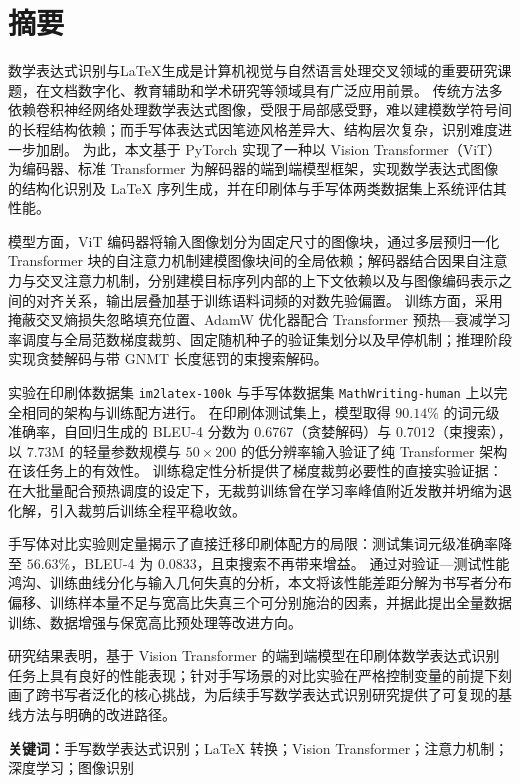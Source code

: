 \section*{\heiti{}摘\qquad 要}

数学表达式识别与LaTeX生成是计算机视觉与自然语言处理交叉领域的重要研究课题，在文档数字化、教育辅助和学术研究等领域具有广泛应用前景。
传统方法多依赖卷积神经网络处理数学表达式图像，受限于局部感受野，难以建模数学符号间的长程结构依赖；而手写体表达式因笔迹风格差异大、结构层次复杂，识别难度进一步加剧。
为此，本文基于 PyTorch 实现了一种以 Vision Transformer（ViT）为编码器、标准 Transformer 为解码器的端到端模型框架，实现数学表达式图像的结构化识别及 LaTeX 序列生成，并在印刷体与手写体两类数据集上系统评估其性能。

模型方面，ViT 编码器将输入图像划分为固定尺寸的图像块，通过多层预归一化 Transformer 块的自注意力机制建模图像块间的全局依赖；解码器结合因果自注意力与交叉注意力机制，分别建模目标序列内部的上下文依赖以及与图像编码表示之间的对齐关系，输出层叠加基于训练语料词频的对数先验偏置。
训练方面，采用掩蔽交叉熵损失忽略填充位置、AdamW 优化器配合 Transformer 预热—衰减学习率调度与全局范数梯度裁剪、固定随机种子的验证集划分以及早停机制；推理阶段实现贪婪解码与带 GNMT 长度惩罚的束搜索解码。

实验在印刷体数据集 \texttt{im2latex-100k} 与手写体数据集 \texttt{MathWriting-human} 上以完全相同的架构与训练配方进行。
在印刷体测试集上，模型取得 $90.14\%$ 的词元级准确率，自回归生成的 BLEU-4 分数为 $0.6767$（贪婪解码）与 $0.7012$（束搜索），以 $7.73$M 的轻量参数规模与 $50\times200$ 的低分辨率输入验证了纯 Transformer 架构在该任务上的有效性。
训练稳定性分析提供了梯度裁剪必要性的直接实验证据：在大批量配合预热调度的设定下，无裁剪训练曾在学习率峰值附近发散并坍缩为退化解，引入裁剪后训练全程平稳收敛。

手写体对比实验则定量揭示了直接迁移印刷体配方的局限：测试集词元级准确率降至 $56.63\%$，BLEU-4 为 $0.0833$，且束搜索不再带来增益。
通过对验证—测试性能鸿沟、训练曲线分化与输入几何失真的分析，本文将该性能差距分解为书写者分布偏移、训练样本量不足与宽高比失真三个可分别施治的因素，并据此提出全量数据训练、数据增强与保宽高比预处理等改进方向。

研究结果表明，基于 Vision Transformer 的端到端模型在印刷体数学表达式识别任务上具有良好的性能表现；针对手写场景的对比实验在严格控制变量的前提下刻画了跨书写者泛化的核心挑战，为后续手写数学表达式识别研究提供了可复现的基线方法与明确的改进路径。

\vspace{0.5cm}
\noindent\textbf{关键词：}手写数学表达式识别；LaTeX 转换；Vision Transformer；注意力机制；深度学习；图像识别
